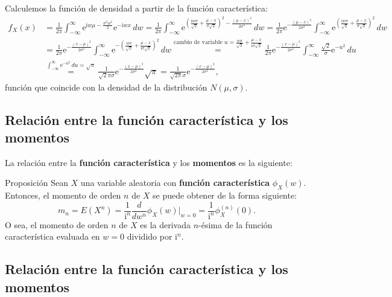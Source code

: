 \documentclass[]{book}
\begin{document}
Calculemos la función de densidad a partir de la función característica:
\[
\begin{array}{rl}
f_X(x) & =\frac{1}{2\pi}\int_{-\infty}^\infty \mathrm{e}^{ \mathrm{i}w \mu -\frac{\sigma^2 w^2}{2}}\mathrm{e}^{-\mathrm{i} w x}\, dw = \frac{1}{2\pi}\int_{-\infty}^\infty \mathrm{e}^{\left(\frac{\mathrm{i}w\sigma}{\sqrt{2}}+\frac{\mu-x}{\sigma\sqrt{2}}\right)^2-\frac{(\mu-x)^2}{2\sigma^2}}\, dw =\frac{1}{2\pi}\mathrm{e}^{-\frac{(\mu-x)^2}{2\sigma^2}}\int_{-\infty}^\infty \mathrm{e}^{\left(\frac{\mathrm{i}w\sigma}{\sqrt{2}}+\frac{\mu-x}{\sigma\sqrt{2}}\right)^2}\, dw \\ & = \frac{1}{2\pi}\mathrm{e}^{-\frac{(x-\mu)^2}{2\sigma^2}}\int_{-\infty}^\infty \mathrm{e}^{-\left(\frac{w\sigma}{\sqrt{2}}+\frac{\mu-x}{\mathrm{i}\sigma\sqrt{2}}\right)^2}\, dw \stackrel{\mbox{cambio de variable } u=\frac{w\sigma}{\sqrt{2}}+\frac{\mu-x}{\mathrm{i}\sigma\sqrt{2}}}{=} \frac{1}{2\pi}\mathrm{e}^{-\frac{(x-\mu)^2}{2\sigma^2}}\int_{-\infty}^\infty \frac{\sqrt{2}}{\sigma}\mathrm{e}^{-u^2}\, du \\ & \stackrel{\int_{-\infty}^\infty \mathrm{e}^{-u^2}\, du =\sqrt{\pi}}{=} \frac{1}{\sqrt{2}\pi\sigma} \mathrm{e}^{-\frac{(x-\mu)^2}{2\sigma^2}} \sqrt{\pi} = \frac{1}{\sqrt{2\pi}\sigma}\mathrm{e}^{-\frac{(x-\mu)^2}{2\sigma^2}},
\end{array}
\]
función que coincide con la densidad de la distribución \(N(\mu,\sigma)\).

\hypertarget{relaciuxf3n-entre-la-funciuxf3n-caracteruxedstica-y-los-momentos}{%
\subsection{Relación entre la función característica y los momentos}\label{relaciuxf3n-entre-la-funciuxf3n-caracteruxedstica-y-los-momentos}}

La relación entre la \textbf{función característica} y los \textbf{momentos} es la siguiente:

 Proposición
Sean \(X\) una variable aleatoria con \textbf{función característica} \(\phi_X(w)\). Entonces, el momento de orden \(n\) de \(X\) se puede obtener de la forma siguiente:
\[
m_n =E\left(X^n\right)=\frac{1}{\mathrm{i}^n}\frac{d}{d w^n}\phi_X(w)|_{w=0} =\frac{1}{\mathrm{i}^n}\phi_X^{(n)}(0).
\]
O sea, el momento de orden \(n\) de \(X\) es la derivada \(n\)-ésima de la función característica evaluada en \(w=0\) dividido por \(\mathrm{i}^n\).

\hypertarget{relaciuxf3n-entre-la-funciuxf3n-caracteruxedstica-y-los-momentos-1}{%
\subsection{Relación entre la función característica y los momentos}\label{relaciuxf3n-entre-la-funciuxf3n-caracteruxedstica-y-los-momentos-1}}
\end{document}
